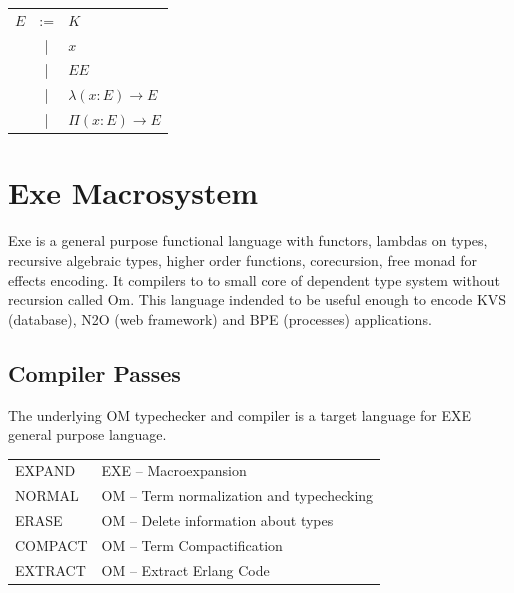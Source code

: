 \documentclass[11pt,oneside]{article}
\begin{document}
\begin{center}
\begin{tabular}{lcl}
      $E$ & :=& $K$ \\
          & | & $x$ \\
          & | & $E E$ \\
          & | & $\lambda (x: E) \rightarrow E$ \\
          & | & $\Pi (x: E) \rightarrow E$ \\
\end{tabular}
\end{center}



\newpage
   \section{Exe Macrosystem}

   Exe is a general purpose functional language with functors, lambdas on types, recursive algebraic types,
   higher order functions, corecursion, free monad for effects encoding. It compilers to
   to small core of dependent type system without recursion called Om.
   This language indended to be useful enough to encode KVS (database), N2O (web framework) and
   BPE (processes) applications.

   \subsection{Compiler Passes}

   The underlying OM typechecker and compiler is a target language for EXE general purpose language.
   \begin{center}
   \begin{tabular}{ll}
   EXPAND  & EXE -- Macroexpansion\\
   NORMAL  & OM -- Term normalization and typechecking\\
   ERASE   & OM -- Delete information about types\\
   COMPACT & OM -- Term Compactification\\
   EXTRACT & OM -- Extract Erlang Code\\
   \end{tabular}
   \end{center}
\end{document}
